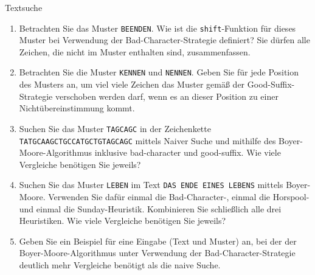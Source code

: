 \documentclass[11pt,a4paper]{article}
\begin{document}
\begin{aufgabe}{3}{Textsuche}
    \begin{enumerate}[label=\alph*)]
        \item Betrachten Sie das Muster \texttt{BEENDEN}.
        Wie ist die \texttt{shift}-Funktion für dieses Muster bei Verwendung der Bad-Character-Strategie definiert?
        Sie dürfen alle Zeichen, die nicht im Muster enthalten sind, zusammenfassen.
        \item Betrachten Sie die Muster \texttt{KENNEN} und \texttt{NENNEN}.
        Geben Sie für jede Position des Musters an, um viel viele Zeichen das Muster gemäß der Good-Suffix-Strategie verschoben werden darf, wenn es an dieser Position zu einer Nichtübereinstimmung kommt.
        \item Suchen Sie das Muster \texttt{TAGCAGC} in der Zeichenkette \texttt{TATGCAAGCTGCCATGCTGTAGCAGC} mittels Naiver Suche und mithilfe des Boyer-Moore-Algorithmus inklusive bad-character und good-suffix.
        Wie viele Vergleiche benötigen Sie jeweils?
        \item 
        Suchen Sie das Muster \texttt{LEBEN} im Text \texttt{DAS ENDE EINES LEBENS} mittels Boyer-Moore.
        Verwenden Sie dafür einmal die Bad-Character-, einmal die Horspool- und einmal die Sunday-Heuristik.
        Kombinieren Sie schließlich alle drei Heuristiken.
        Wie viele Vergleiche benötigen Sie jeweils?
        \item Geben Sie ein Beispiel für eine Eingabe (Text und Muster) an, bei der der Boyer-Moore-Algorithmus unter Verwendung der Bad-Character-Strategie deutlich mehr Vergleiche benötigt als die naive Suche.

\end{enumerate}
\end{aufgabe}
\end{document}
